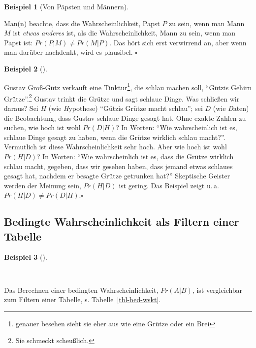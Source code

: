 \documentclass[
  ngerman,
  letterpaper,
  twoside,
  open=any]{scrbook}
\theoremstyle{definition}
\newtheorem{example}{Beispiel}[chapter]
\theoremstyle{plain}
\theoremstyle{definition}
\theoremstyle{definition}
\theoremstyle{definition}
\newtheorem{example}{Beispiel}[chapter]
\theoremstyle{definition}
\theoremstyle{remark}
\begin{document}
\begin{example}[Von Päpsten und
Männern]\protect\hypertarget{exm-papst}{}\label{exm-papst}

Man(n) beachte, dass die Wahrscheinlichkeit, Papst \(P\) zu sein, wenn
man Mann \(M\) ist \emph{etwas anderes} ist, als die Wahrscheinlichkeit,
Mann zu sein, wenn man Papst ist: \(Pr(P|M) \ne Pr(M|P)\). Das hört sich
erst verwirrend an, aber wenn man darüber nachdenkt, wird es plausibel.
\(\square\)

\end{example}

\begin{example}[]\protect\hypertarget{exm-hirn-grütze}{}\label{exm-hirn-grütze}

Gustav Groß-Gütz verkauft eine Tinktur\footnote{genauer besehen sieht
  sie eher aus wie eine Grütze oder ein Brei}, die schlau machen soll,
\enquote{Gützis Gehirn Grütze}.\footnote{Sie schmeckt scheußlich.}
Gustav trinkt die Grütze und sagt schlaue Dinge. Was schließen wir
daraus? Sei \(H\) (wie \emph{H}ypothese) \enquote{Gützis Grütze macht
schlau}; sei \(D\) (wie \emph{D}aten) die Beobachtung, dass Gustav
schlaue Dinge gesagt hat. Ohne exakte Zahlen zu suchen, wie hoch ist
wohl \(Pr(D|H)\)? In Worten: \enquote{Wie wahrscheinlich ist es, schlaue
Dinge gesagt zu haben, wenn die Grütze wirklich schlau macht?}.
Vermutlich ist diese Wahrscheinlichkeit sehr hoch. Aber wie hoch ist
wohl \(Pr(H|D)\)? In Worten: \enquote{Wie wahrscheinlich ist es, dass
die Grütze wirklich schlau macht, gegeben, dass wir gesehen haben, dass
jemand etwas schlaues gesagt hat, nachdem er besagte Grütze getrunken
hat?} Skeptische Geister werden der Meinung sein, \(Pr(H|D)\) ist
gering. Das Beispiel zeigt u.\,a. \(Pr(H|D) \ne Pr(D|H).\square\)

\end{example}

\subsection{Bedingte Wahrscheinlichkeit als Filtern einer
Tabelle}\label{bedingte-wahrscheinlichkeit-als-filtern-einer-tabelle}

\begin{example}[]\protect\hypertarget{exm-kalt-regen-filter}{}\label{exm-kalt-regen-filter}

~

\end{example}

Das Berechnen einer bedingten Wahrscheinlichkeit, \(Pr(A|B)\), ist
vergleichbar zum Filtern einer Tabelle, s. Tabelle~\ref{tbl-bed-wskt}.
\end{document}
